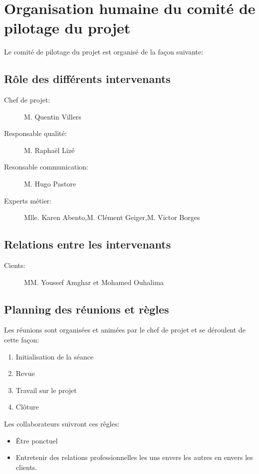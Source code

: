 
\section{Organisation humaine du comité de pilotage du projet}

Le comité de pilotage du projet est organisé de la façon suivante:

    \subsection{Rôle des différents intervenants}
\begin{description}
\item[Chef de projet:]M. Quentin Villers
\item[Responsable qualité:]M. Raphaël Lizé
\item[Resonsable communication:]M. Hugo Pastore
\item[Experts métier:]Mlle. Karen Abento,M. Clément Geiger,M. Victor Borges
\end{description}

    \subsection{Relations entre les intervenants}
\begin{description}
\item[Cients:]MM. Youssef Amghar et Mohamed Ouhalima 
\end{description}

    \subsection{Planning des réunions et règles}
Les réunions sont organisées et animées par le chef de projet et se
déroulent de cette façon:
\begin{enumerate}
\item Initialisation de la séance
\item Revue
\item Travail sur le projet
\item Clôture
\end{enumerate}

Les collaborateurs suivront ces rêgles:
\begin{itemize}
\item Être ponctuel
\item Entretenir des relations professionnelles les uns envers les
        autres en envers les clients.
\end{itemize}
